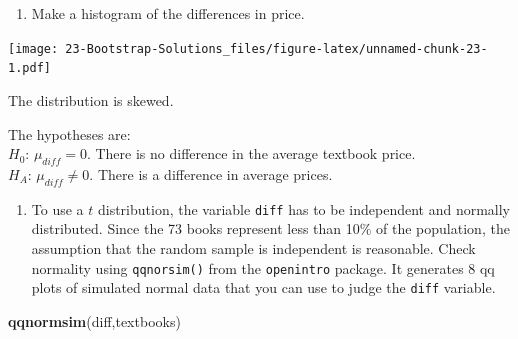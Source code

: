 \documentclass[
]{book}
\newenvironment{Shaded}{\begin{snugshade}}{\end{snugshade}}
\newcommand{\DataTypeTok}[1]{\textcolor[rgb]{0.13,0.29,0.53}{#1}}
\newcommand{\KeywordTok}[1]{\textcolor[rgb]{0.13,0.29,0.53}{\textbf{#1}}}
\newcommand{\NormalTok}[1]{#1}
\newcommand{\OperatorTok}[1]{\textcolor[rgb]{0.81,0.36,0.00}{\textbf{#1}}}
\newcommand{\StringTok}[1]{\textcolor[rgb]{0.31,0.60,0.02}{#1}}
\providecommand{\tightlist}{%
  \setlength{\itemsep}{0pt}\setlength{\parskip}{0pt}}
\begin{document}
\begin{enumerate}
\def\labelenumi{\alph{enumi}.}
\setcounter{enumi}{2}
\tightlist
\item
  Make a histogram of the differences in price.
\end{enumerate}

\begin{Shaded}
\end{Shaded}

\texttt{[image: 23-Bootstrap-Solutions\_files/figure-latex/unnamed-chunk-23-1.pdf]}

The distribution is skewed.

The hypotheses are:\\
\(H_0\): \(\mu_{diff}=0\). There is no difference in the average textbook price.\\
\(H_A\): \(\mu_{diff} \neq 0\). There is a difference in average prices.

\begin{enumerate}
\def\labelenumi{\alph{enumi}.}
\setcounter{enumi}{3}
\tightlist
\item
  To use a \(t\) distribution, the variable \texttt{diff} has to be independent and normally distributed. Since the 73 books represent less than 10\% of the population, the assumption that the random sample is independent is reasonable. Check normality using \texttt{qqnorsim()} from the \texttt{openintro} package. It generates 8 qq plots of simulated normal data that you can use to judge the \texttt{diff} variable.
\end{enumerate}

\begin{Shaded}
\begin{Highlighting}[]
\KeywordTok{qqnormsim}\NormalTok{(diff,textbooks)}
\end{Highlighting}
\end{Shaded}
\end{document}
